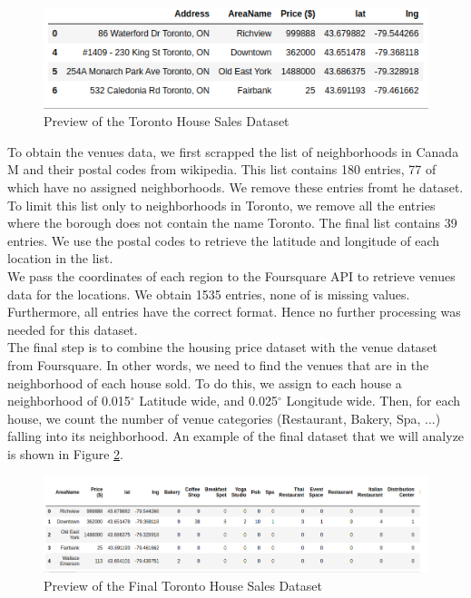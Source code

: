 \documentclass{article}
\begin{document}
\begin{figure}[hbt!]
	
	\includegraphics[width=\textwidth]{hs_final.png}
	\caption{Preview of the Toronto House Sales Dataset}
	\label{fig:final_hs}
	
\end{figure}

To obtain the venues data, we first scrapped the list of neighborhoods in Canada M and their postal codes from wikipedia. This list contains 180 entries, 77 of which have no assigned neighborhoods. We remove these entries fromt he dataset. To limit this list only to neighborhoods in Toronto, we remove all the entries where the borough does not contain the name Toronto. The final list contains 39 entries. We use the postal codes to retrieve the latitude and longitude of each location in the list. \\

We pass the coordinates of each region to the Foursquare API to retrieve venues data for the locations. We obtain 1535 entries, none of is missing values. Furthermore, all entries have the correct format. Hence no further processing was needed for this dataset. \\

The final step is to combine the housing price dataset with the venue dataset from Foursquare. In other words, we need to find the venues that are in the neighborhood of each house sold. To do this, we assign to each house a neighborhood of 0.015$^\circ$ Latitude wide, and 0.025$^\circ$ Longitude wide. %
Then, for each house, we count the number of venue categories (Restaurant, Bakery, Spa, ...) falling into its neighborhood. An example of the final dataset that we will analyze is shown in Figure \ref{fig:final}.

\begin{figure}[hbt!]
	
	\includegraphics[width=\textwidth]{final.png}
	\caption{Preview of the Final Toronto House Sales Dataset}
	\label{fig:final}
	
\end{figure}
\end{document}
